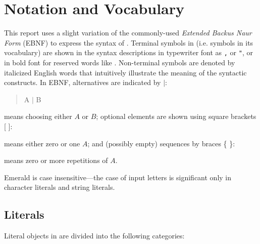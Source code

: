 \section{Notation and Vocabulary}
\label{lexical considerations}
This report uses a slight variation of the commonly-used {\em Extended Backus
Naur Form} (EBNF) to express the syntax of \emd{}.
Terminal symbols in \emd{} (i.e. symbols in its vocabulary)
are shown in the syntax descriptions in typewriter font as {\tt ,} or
{\tt "}, or in bold font for reserved words like
.
Non-terminal symbols are denoted by italicized English words
that intuitively illustrate the meaning of the syntactic constructs.
In EBNF, alternatives are indicated by $|$:
\begin{quote}A $|$ B\end{quote}
means choosing either $A$ or $B$; optional elements are shown using
square brackets [ ]:
\begin{quote}\end{quote}

means either zero or one $A$; and (possibly empty) sequences by
braces \{ \}:
\begin{quote}\end{quote}

means zero or more repetitions of $A$.

Emerald is case insensitive---the case of input letters is significant only
in character literals and string literals.

\subsection{Literals}
Literal objects in \emd{} are divided into the following categories:


